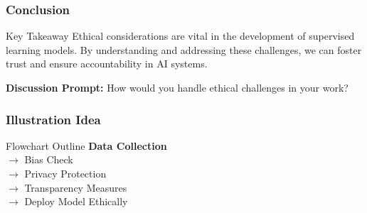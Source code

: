 \documentclass[aspectratio=169]{beamer}
\begin{document}
\begin{frame}[fragile]
    \frametitle{Conclusion}
    \begin{block}{Key Takeaway}
        Ethical considerations are vital in the development of supervised learning models. By understanding and addressing these challenges, we can foster trust and ensure accountability in AI systems.
    \end{block}
    \vfill
    \textbf{Discussion Prompt:} How would you handle ethical challenges in your work?
\end{frame}

\begin{frame}[fragile]
    \frametitle{Illustration Idea}
    \begin{block}{Flowchart Outline}
        \textbf{Data Collection} \\
        $\rightarrow$ Bias Check \\
        $\rightarrow$ Privacy Protection \\
        $\rightarrow$ Transparency Measures \\
        $\rightarrow$ Deploy Model Ethically
    \end{block}
\end{frame}
\end{document}
